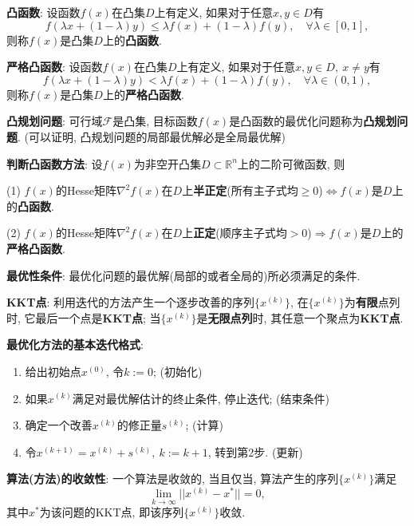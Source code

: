 \documentclass[12pt, a4paper, oneside]{ctexart}
\let\leq=\leqslant %
\let\geq=\geqslant %
\def\R{\mathbb{R}}          %
\begin{document}
\textbf{凸函数}: 设函数$f(x)$在凸集$D$上有定义, 如果对于任意$x, y\in D$有
\begin{equation*}
    f(\lambda x+(1-\lambda)y)\leq \lambda f(x)+(1-\lambda)f(y),\quad \forall \lambda\in[0,1],
\end{equation*}
则称$f(x)$是凸集$D$上的\textbf{凸函数}.

\textbf{严格凸函数}: 设函数$f(x)$在凸集$D$上有定义, 如果对于任意$x, y\in D,\ x\neq y$有
\begin{equation*}
    f(\lambda x+(1-\lambda)y)< \lambda f(x)+(1-\lambda)f(y),\quad \forall \lambda\in(0,1),
\end{equation*}
则称$f(x)$是凸集$D$上的\textbf{严格凸函数}.

\textbf{凸规划问题}: 可行域$\mathcal{F}$是凸集, 目标函数$f(x)$是凸函数的最优化问题称为\textbf{凸规划问题}. (可以证明, 凸规划问题的局部最优解必是全局最优解)

\textbf{判断凸函数方法}: 设$f(x)$为非空开凸集$D\subset \R^n$上的二阶可微函数, 则

(1) $f(x)$的Hesse矩阵$\nabla^2 f(x)$在$D$上\textbf{半正定}(所有主子式均$\geq 0$)$\iff$$f(x)$是$D$上的\textbf{凸函数}.

(2) $f(x)$的Hesse矩阵$\nabla^2 f(x)$在$D$上\textbf{正定}(顺序主子式均$ > 0$)$\Rightarrow$$f(x)$是$D$上的\textbf{严格凸函数}.

\textbf{最优性条件}: 最优化问题的最优解(局部的或者全局的)所必须满足的条件.

\textbf{KKT点}: 利用迭代的方法产生一个逐步改善的序列$\{x^{(k)}\}$, 在$\{x^{(k)}\}$为\textbf{有限}点列时, 它最后一个点是\textbf{KKT点}; 当$\{x^{(k)}\}$是\textbf{无限点列}时, 其任意一个聚点为\textbf{KKT点}.

\textbf{最优化方法的基本迭代格式}:
\begin{enumerate}
    \item 给出初始点$x^{(0)}$, 令$k:=0$; (初始化)

    \item 如果$x^{(k)}$满足对最优解估计的终止条件, 停止迭代; (结束条件)

    \item 确定一个改善$x^{(k)}$的修正量$s^{(k)}$; (计算)

    \item 令$x^{(k+1)} = x^{(k)} + s^{(k)},\ k:=k+1$, 转到第2步. (更新)
\end{enumerate}


\textbf{算法(方法)的收敛性}: 一个算法是收敛的, 当且仅当, 算法产生的序列$\{x^{(k)}\}$满足
\begin{equation*}
    \lim_{k\to\infty}||x^{(k)}-x^*|| = 0,
\end{equation*}
其中$x^*$为该问题的KKT点, 即该序列$\{x^{(k)}\}$收敛.
\end{document}
